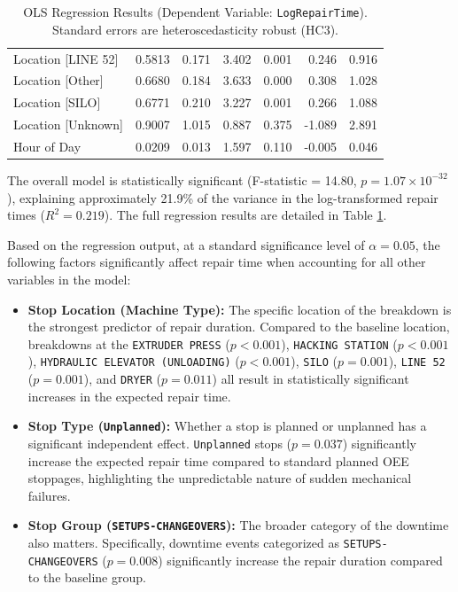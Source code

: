 \begin{table}[H]
{\begin{tabular}{lrrrrrr}
        Location [LINE 52] & 0.5813 & 0.171 & 3.402 & 0.001 & 0.246 & 0.916 \\
        Location [Other] & 0.6680 & 0.184 & 3.633 & 0.000 & 0.308 & 1.028 \\
        Location [SILO] & 0.6771 & 0.210 & 3.227 & 0.001 & 0.266 & 1.088 \\
        Location [Unknown] & 0.9007 & 1.015 & 0.887 & 0.375 & -1.089 & 2.891 \\
        Hour of Day & 0.0209 & 0.013 & 1.597 & 0.110 & -0.005 & 0.046 \\
        \bottomrule
    \end{tabular}
    }
    \caption{OLS Regression Results (Dependent Variable: \texttt{LogRepairTime}). Standard errors are heteroscedasticity robust (HC3).}
    \label{tab:regression_results}
\end{table}

The overall model is statistically significant (F-statistic = 14.80, $p = 1.07 \times 10^{-32}$), explaining approximately 21.9\% of the variance in the log-transformed repair times ($R^2 = 0.219$). The full regression results are detailed in Table \ref{tab:regression_results}.

Based on the regression output, at a standard significance level of $\alpha = 0.05$, the following factors significantly affect repair time when accounting for all other variables in the model:

\begin{itemize}
    \item \textbf{Stop Location (Machine Type):} The specific location of the breakdown is the strongest predictor of repair duration. Compared to the baseline location, breakdowns at the \texttt{EXTRUDER PRESS} ($p < 0.001$), \texttt{HACKING STATION} ($p < 0.001$), \texttt{HYDRAULIC ELEVATOR (UNLOADING)} ($p < 0.001$), \texttt{SILO} ($p = 0.001$), \texttt{LINE 52} ($p = 0.001$), and \texttt{DRYER} ($p = 0.011$) all result in statistically significant increases in the expected repair time.
    \item \textbf{Stop Type (\texttt{Unplanned}):} Whether a stop is planned or unplanned has a significant independent effect. \texttt{Unplanned} stops ($p = 0.037$) significantly increase the expected repair time compared to standard planned OEE stoppages, highlighting the unpredictable nature of sudden mechanical failures.
    \item \textbf{Stop Group (\texttt{SETUPS-CHANGEOVERS}):} The broader category of the downtime also matters. Specifically, downtime events categorized as \texttt{SETUPS-CHANGEOVERS} ($p = 0.008$) significantly increase the repair duration compared to the baseline group.
\end{itemize}

